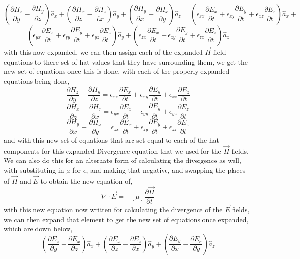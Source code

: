 \documentclass[]{article}
\begin{document}
\[(\frac{\partial{H}_z}{\partial{y}} - \frac{\partial{H}_y}{\partial{z}})\hat{a}_x + (\frac{\partial{H}_x}{\partial{z}} - \frac{\partial{H}_z}{\partial{x}})\hat{a}_y + (\frac{\partial{H}_y}{\partial{x}} - \frac{\partial{H}_x}{\partial{y}})\hat{a}_z = (\epsilon_{xx}\frac{\partial{E}_x}{\partial{t}} + \epsilon_{xy}\frac{\partial{E}_y}{\partial{t}} + \epsilon_{xz}\frac{\partial{E}_z}{\partial{t}})\hat{a}_x +\]
\[(\epsilon_{yx}\frac{\partial{E}_x}{\partial{t}} + \epsilon_{yy}\frac{\partial{E}_y}{\partial{t}} + \epsilon_{yz}\frac{\partial{E}_z}{\partial{t}})\hat{a}_y + (\epsilon_{zx}\frac{\partial{E}_x}{\partial{t}} + \epsilon_{zy}\frac{\partial{E}_y}{\partial{t}} + \epsilon_{zz}\frac{\partial{E}_z}{\partial{t}})\hat{a}_z\]
with this now expanded, we can then assign each of the expanded $\vec{H}$ field equations to there set of hat values that they have surrounding them, we get the new set of equations once this is done, with each of the properly expanded equations being done,
\[\frac{\partial{H}_z}{\partial{y}} - \frac{\partial{H}_y}{\partial{z}} = \epsilon_{xx}\frac{\partial{E}_x}{\partial{t}} + \epsilon_{xy}\frac{\partial{E}_y}{\partial{t}} + \epsilon_{xz}\frac{\partial{E}_z}{\partial{t}} \]
\[\frac{\partial{H}_x}{\partial{z}} - \frac{\partial{H}_z}{\partial{x}} = \epsilon_{yx}\frac{\partial{E}_x}{\partial{t}} + \epsilon_{yy}\frac{\partial{E}_y}{\partial{t}} + \epsilon_{yz}\frac{\partial{E}_z}{\partial{t}} \]
\[\frac{\partial{H}_y}{\partial{x}} - \frac{\partial{H}_x}{\partial{y}} = \epsilon_{zx}\frac{\partial{E}_x}{\partial{t}} + \epsilon_{zy}\frac{\partial{E}_y}{\partial{t}} + \epsilon_{zz}\frac{\partial{E}_z}{\partial{t}}\]
and with this new set of equations that are set equal to each of the hat components for this expanded Divergence equation that we used for the $\vec{H}$ fields. We can also do this for an alternate form of calculating the divergence as well, with substituting in $\mu$ for $\epsilon$, and making that negative, and swapping the places of $\vec{H}$ and $\vec{E}$ to obtain the new equation of,
\begin{equation}
\nabla \cdot \vec{E} = -[\mu] \frac{\partial{\vec{H}}}{\partial{t}}
\end{equation}
with this new equation now written for calculating the divergence of the $\vec{E}$ fields, we can then expand that element to get the new set of equations once expanded, which are down below,
\begin{equation}
{(\frac{\partial{E}_z}{\partial{y}} - \frac{\partial{E}_x}{\partial{z}})\hat{a}_x + (\frac{\partial{E}_x}{\partial{z}} - \frac{\partial{E}_z}{\partial{x}})\hat{a}_y + (\frac{\partial{E}_y}{\partial{x}} - \frac{\partial{E}_x}{\partial{y}})\hat{a}_z}
\end{equation}
\end{document}
